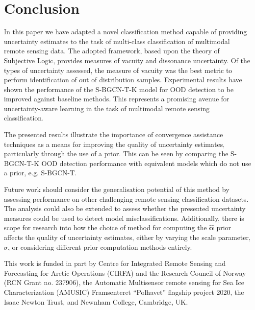 \documentclass[
twocolumn,
]{ceurart}
\begin{document}
\section{Conclusion}
\label{sec::conclusion}

In this paper we have adapted a novel classification method capable of providing uncertainty estimates to the task of multi-class classification of multimodal remote sensing data.
The adopted framework, based upon the theory of Subjective Logic, provides measures of vacuity and dissonance uncertainty.
Of the types of uncertainty assessed, the measure of vacuity was the best metric to perform identification of out of distribution samples.
Experimental results have shown the performance of the S-BGCN-T-K model for OOD detection to be improved against baseline methods.
This represents a promising avenue for uncertainty-aware learning in the task of multimodal remote sensing classification.

The presented results illustrate the importance of convergence assistance techniques as a means for improving the quality of uncertainty estimates, particularly through the use of a prior.
This can be seen by comparing the S-BGCN-T-K OOD detection performance with equivalent models which do not use a prior, e.g. S-BGCN-T.

Future work should consider the generalisation potential of this method by assessing performance on other challenging remote sensing classification datasets.
The analysis could also be extended to assess whether the presented uncertainty measures could be used to detect model misclassifications.
Additionally, there is scope for research into how the choice of method for computing the $\hat{\boldsymbol{\alpha}}$ prior affects the quality of uncertainty estimates, either by varying the scale parameter, $\sigma$, or considering different prior computation methods entirely.
\begin{acknowledgments}
This work is funded in part by Centre for Integrated Remote Sensing and Forecasting for Arctic Operations (CIRFA) and the Research Council of Norway (RCN Grant no. 237906), the Automatic Multisensor remote sensing for Sea Ice Characterization (AMUSIC) Framsenteret ``Polhavet'' flagship project 2020, the Isaac Newton Trust, and Newnham College, Cambridge, UK.
\end{acknowledgments}


\end{document}
